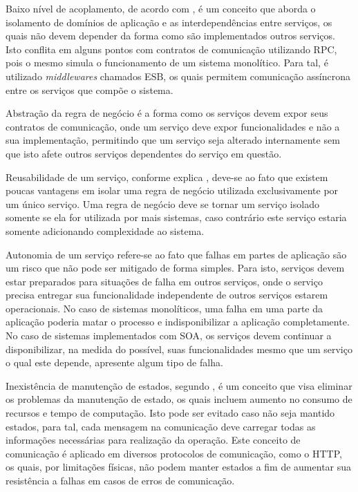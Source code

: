 Baixo nível de acoplamento, de acordo com , é um
conceito que aborda o isolamento de domínios de aplicação e as
interdependências entre serviços, os quais não devem depender da forma
como são implementados outros serviços. Isto conflita em alguns pontos
com contratos de comunicação utilizando \ac{RPC}, pois o mesmo simula
o funcionamento de um sistema monolítico. Para tal, é utilizado
\emph{middlewares} chamados \ac{ESB}, os quais permitem comunicação
assíncrona entre os serviços que compõe o sistema.

Abstração da regra de negócio é a forma como os serviços devem expor
seus contratos de comunicação, onde um serviço deve expor funcionalidades
e não a sua implementação, permitindo que um serviço seja alterado internamente
sem que isto afete outros serviços dependentes do serviço em questão.

Reusabilidade de um serviço, conforme explica , deve-se
ao fato que existem poucas vantagens em isolar uma regra de negócio utilizada
exclusivamente por um único serviço. Uma regra de negócio deve se tornar um
serviço isolado somente se ela for utilizada por mais sistemas, caso
contrário este serviço estaria somente adicionando complexidade ao sistema.

Autonomia de um serviço refere-se ao fato que falhas em partes de aplicação
são um risco que não pode ser mitigado de forma simples. Para isto, serviços
devem estar preparados para situações de falha em outros serviços, onde
o serviço precisa entregar sua funcionalidade independente de outros serviços
estarem operacionais. No caso de sistemas monolíticos, uma falha
em uma parte da aplicação poderia matar o processo e indisponibilizar
a aplicação completamente. No caso de sistemas implementados com \ac{SOA}, os
serviços devem continuar a disponibilizar, na medida do possível, suas
funcionalidades mesmo que um serviço o qual este depende, apresente algum tipo
de falha.

Inexistência de manutenção de estados, segundo , é
um conceito que visa eliminar os problemas da manutenção de estado, os quais
incluem aumento no consumo de recursos e tempo de computação.  Isto pode ser
evitado caso não seja mantido estados, para tal, cada mensagem na
comunicação deve carregar todas as informações necessárias para realização
da operação. Este conceito de comunicação é aplicado em diversos protocolos
de comunicação, como o \ac{HTTP}, os quais, por limitações físicas, não podem
manter estados a fim de aumentar sua resistência a falhas em casos de erros
de comunicação.

